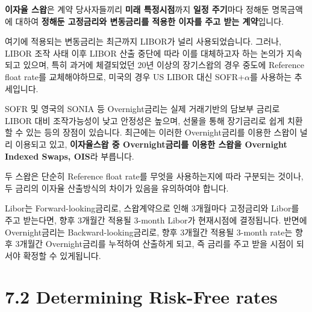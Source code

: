 \documentclass[
  letterpaper,
  DIV=11,
  numbers=noendperiod]{scrreprt}
\begin{document}

\textbf{이자율 스왑}은 계약 당사자들끼리 \textbf{미래 특정시점}까지
\textbf{일정 주기}마다 정해둔 명목금액에 대하여 \textbf{정해둔
고정금리와 변동금리를 적용한 이자를 주고 받는 계약}입니다.

여기에 적용되는 변동금리는 최근까지 LIBOR가 널리 사용되었습니다. 그러나,
LIBOR 조작 사태 이후 LIBOR 산출 중단에 따라 이를 대체하고자 하는 논의가
지속되고 있으며, 특히 과거에 체결되었던 20년 이상의 장기스왑의 경우
중도에 Reference float rate를 교체해야하므로, 미국의 경우 US LIBOR 대신
SOFR+\(\alpha\)를 사용하는 추세입니다.

SOFR 및 영국의 SONIA 등 Overnight금리는 실제 거래기반의 담보부 금리로
LIBOR 대비 조작가능성이 낮고 안정성은 높으며, 선물을 통해 장기금리로
쉽게 치환할 수 있는 등의 장점이 있습니다. 최근에는 이러한
Overnight금리를 이용한 스왑이 널리 이용되고 있고, \textbf{이자율스왑 중
Overnight금리를 이용한 스왑을 Overnight Indexed Swaps, OIS}라 부릅니다.

\begin{tcolorbox}[enhanced jigsaw, titlerule=0mm, bottomtitle=1mm, left=2mm, title=\textcolor{quarto-callout-note-color}{\faInfo}\hspace{0.5em}{LIBOR swaps vs.~OISs}, toptitle=1mm, bottomrule=.15mm, colframe=quarto-callout-note-color-frame, breakable, opacityback=0, rightrule=.15mm, opacitybacktitle=0.6, coltitle=black, colback=white, arc=.35mm, colbacktitle=quarto-callout-note-color!10!white, toprule=.15mm, leftrule=.75mm]

두 스왑은 단순히 Reference float rate를 무엇을 사용하는지에 따라
구분되는 것이나, 두 금리의 이자율 산출방식의 차이가 있음을 유의하여야
합니다.

Libor는 Forward-looking금리로, 스왑계약으로 인해 3개월마다 고정금리와
Libor를 주고 받는다면, 향후 3개월간 적용될 3-month Libor가 현재시점에
결정됩니다. 반면에 Overnight금리는 Backward-looking금리로, 향후 3개월간
적용될 3-month rate는 향후 3개월간 Overnight금리를 누적하여 산출하게
되고, 즉 금리를 주고 받을 시점이 되서야 확정할 수 있게됩니다.

\end{tcolorbox}

\section*{7.2 Determining Risk-Free
rates}\label{determining-risk-free-rates}
\end{document}
